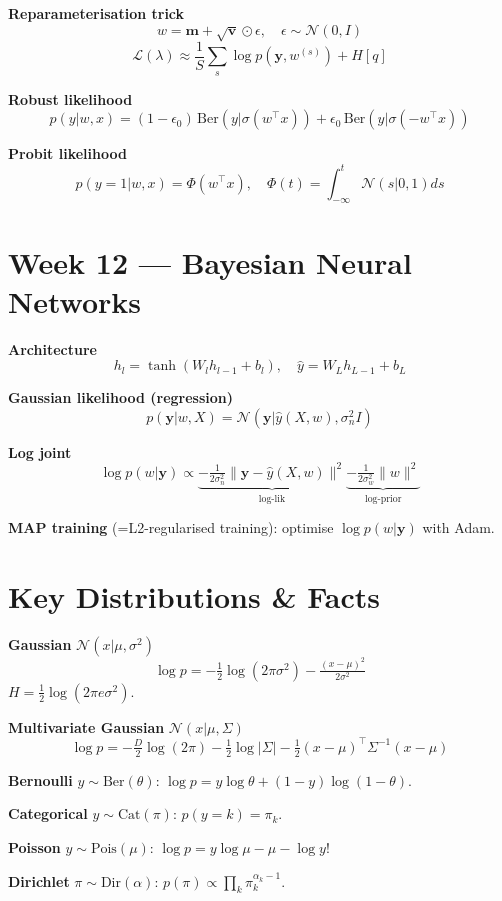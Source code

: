 \documentclass[9pt,a4paper]{extarticle}
\newcommand{\N}{\mathcal{N}}
\renewcommand{\vec}[1]{\bm{#1}}
\begin{document}
\textbf{Reparameterisation trick}
\[
w = \vec{m} + \sqrt{\vec{v}}\odot\epsilon,\quad \epsilon\sim\N(0,I)
\]
\[
\mathcal{L}(\lambda) \approx \frac{1}{S}\sum_s\log p(\vec{y},w^{(s)}) + H[q]
\]

\textbf{Robust likelihood}
\[
p(y|w,x) = (1-\epsilon_0)\,\mathrm{Ber}(y|\sigma(w^\top x)) + \epsilon_0\,\mathrm{Ber}(y|\sigma(-w^\top x))
\]

\textbf{Probit likelihood}
\[
p(y=1|w,x) = \Phi(w^\top x),\quad \Phi(t)=\int_{-\infty}^t\N(s|0,1)ds
\]

\section{Week 12 — Bayesian Neural Networks}

\textbf{Architecture}
\[
h_l = \tanh(W_l h_{l-1}+b_l),\quad \hat{y} = W_L h_{L-1}+b_L
\]

\textbf{Gaussian likelihood (regression)}
\[
p(\vec{y}|w,X) = \N(\vec{y}|\hat{y}(X,w),\sigma^2_n I)
\]

\textbf{Log joint}
\[
\log p(w|\vec{y}) \propto \underbrace{-\tfrac{1}{2\sigma^2_n}\|\vec{y}-\hat{y}(X,w)\|^2}_{\log\text{-lik}} \underbrace{-\tfrac{1}{2\sigma^2_w}\|w\|^2}_{\log\text{-prior}}
\]

\textbf{MAP training} (=L2-regularised training): optimise $\log p(w|\vec{y})$ with Adam.

\section{Key Distributions \& Facts}

\textbf{Gaussian} $\N(x|\mu,\sigma^2)$
\[
\log p = -\tfrac{1}{2}\log(2\pi\sigma^2) - \tfrac{(x-\mu)^2}{2\sigma^2}
\]
$H = \tfrac{1}{2}\log(2\pi e\sigma^2)$.

\textbf{Multivariate Gaussian} $\N(x|\mu,\Sigma)$
\[
\log p = -\tfrac{D}{2}\log(2\pi)-\tfrac{1}{2}\log|\Sigma|-\tfrac{1}{2}(x-\mu)^\top\Sigma^{-1}(x-\mu)
\]

\textbf{Bernoulli} $y\sim\mathrm{Ber}(\theta)$: $\log p=y\log\theta+(1-y)\log(1-\theta)$.

\textbf{Categorical} $y\sim\mathrm{Cat}(\pi)$: $p(y=k)=\pi_k$.

\textbf{Poisson} $y\sim\mathrm{Pois}(\mu)$: $\log p = y\log\mu - \mu - \log y!$

\textbf{Dirichlet} $\pi\sim\mathrm{Dir}(\alpha)$: $p(\pi)\propto\prod_k\pi_k^{\alpha_k-1}$.
\end{document}
